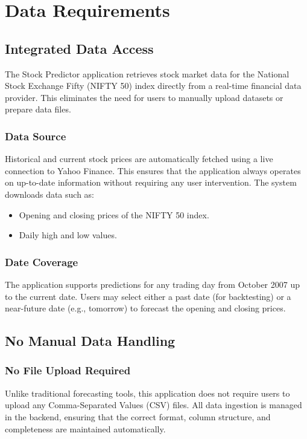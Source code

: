 %
%

\chapter{Data Requirements}

\section{Integrated Data Access}
The Stock Predictor application retrieves stock market data for the National Stock Exchange Fifty (NIFTY 50) index directly from a real-time financial data provider. This eliminates the need for users to manually upload datasets or prepare data files.

\subsection{Data Source}
Historical and current stock prices are automatically fetched using a live connection to Yahoo Finance. This ensures that the application always operates on up-to-date information without requiring any user intervention. The system downloads data such as:

\begin{itemize}
	\item Opening and closing prices of the NIFTY 50 index.
	\item Daily high and low values.
\end{itemize}

\subsection{Date Coverage}
The application supports predictions for any trading day from October 2007 up to the current date. Users may select either a past date (for backtesting) or a near-future date (e.g., tomorrow) to forecast the opening and closing prices.

\section{No Manual Data Handling}
\subsection{No File Upload Required}
Unlike traditional forecasting tools, this application does not require users to upload any Comma-Separated Values (CSV) files. All data ingestion is managed in the backend, ensuring that the correct format, column structure, and completeness are maintained automatically.

